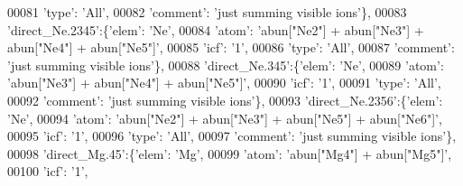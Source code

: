 \begin{DoxyCode}
00081                                        \textcolor{stringliteral}{'type'}: \textcolor{stringliteral}{'All'},
00082                                        \textcolor{stringliteral}{'comment'}: \textcolor{stringliteral}{'just summing visible ions'}\},
00083                          \textcolor{stringliteral}{'direct\_Ne.2345'}:\{\textcolor{stringliteral}{'elem'}: \textcolor{stringliteral}{'Ne'},
00084                                        \textcolor{stringliteral}{'atom'}: \textcolor{stringliteral}{'abun["Ne2"] + abun["Ne3"] + abun["Ne4"] + abun["Ne5"]'},
00085                                        \textcolor{stringliteral}{'icf'}: \textcolor{stringliteral}{'1'},
00086                                        \textcolor{stringliteral}{'type'}: \textcolor{stringliteral}{'All'},
00087                                        \textcolor{stringliteral}{'comment'}: \textcolor{stringliteral}{'just summing visible ions'}\},
00088                          \textcolor{stringliteral}{'direct\_Ne.345'}:\{\textcolor{stringliteral}{'elem'}: \textcolor{stringliteral}{'Ne'},
00089                                        \textcolor{stringliteral}{'atom'}: \textcolor{stringliteral}{'abun["Ne3"] + abun["Ne4"] + abun["Ne5"]'},
00090                                        \textcolor{stringliteral}{'icf'}: \textcolor{stringliteral}{'1'},
00091                                        \textcolor{stringliteral}{'type'}: \textcolor{stringliteral}{'All'},
00092                                        \textcolor{stringliteral}{'comment'}: \textcolor{stringliteral}{'just summing visible ions'}\},
00093                          \textcolor{stringliteral}{'direct\_Ne.2356'}:\{\textcolor{stringliteral}{'elem'}: \textcolor{stringliteral}{'Ne'},
00094                                        \textcolor{stringliteral}{'atom'}: \textcolor{stringliteral}{'abun["Ne2"] + abun["Ne3"] + abun["Ne5"] + abun["Ne6"]'},
00095                                        \textcolor{stringliteral}{'icf'}: \textcolor{stringliteral}{'1'},
00096                                        \textcolor{stringliteral}{'type'}: \textcolor{stringliteral}{'All'},
00097                                        \textcolor{stringliteral}{'comment'}: \textcolor{stringliteral}{'just summing visible ions'}\},
00098                          \textcolor{stringliteral}{'direct\_Mg.45'}:\{\textcolor{stringliteral}{'elem'}: \textcolor{stringliteral}{'Mg'},
00099                                        \textcolor{stringliteral}{'atom'}: \textcolor{stringliteral}{'abun["Mg4"] + abun["Mg5"]'},
00100                                        \textcolor{stringliteral}{'icf'}: \textcolor{stringliteral}{'1'},

\end{DoxyCode}
